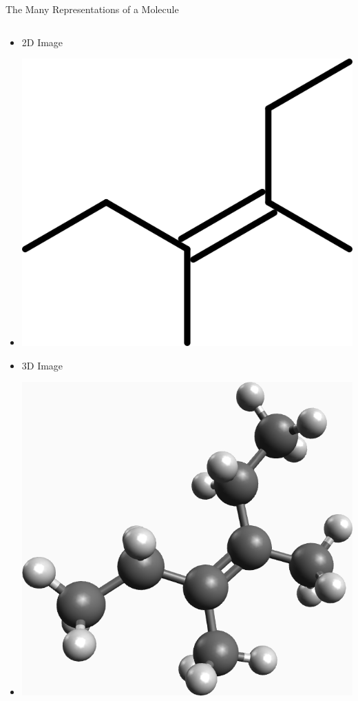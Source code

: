 \documentclass[10pt]{beamer}
\begin{document}
{%

\begin{frame}{The Many Representations of a Molecule}
  \begin{columns}[c] %
    \begin{column}{.3\textwidth}
      \begin{itemize}
        \item[] {\alert{2D Image}}
        \item[] {\includegraphics[width=0.95\linewidth]{images/2dRepr.PNG}}
        \item[] {\alert{3D Image}}
        \item[] {\includegraphics[width=0.95\linewidth]{images/3dRepr.PNG}}
      \end{itemize}
    \end{column}


\end{columns}
\end{frame}}
\end{document}
